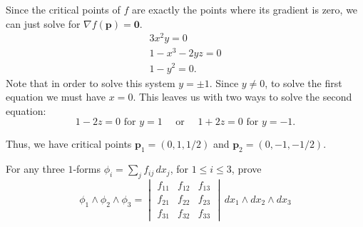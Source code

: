 \documentclass[12 pt, letterpaper]{hmcpset}
\begin{document}
\begin{solution}
\begin{enumerate}
			Since the critical points of $f$ are exactly the points where its gradient is zero, we can just solve for $\nabla f(\mathbf p) = \mathbf 0$.
			\[
				\begin{gathered}
					3 x^2 y = 0 \\
					1 - x^3 - 2y z = 0 \\
					1 - y^2 = 0.
				\end{gathered}
			\]
			Note that in order to solve this system $y = \pm 1$. Since $y \neq 0$, to solve the first equation we must have $x = 0$. This leaves us with two ways to solve the second equation:
			\[
				1 - 2z = 0 \text{ for } y = 1 \quad \text{ or } \quad 1 + 2z = 0 \text{ for } y = - 1.
			\] 

			Thus, we have critical points $\mathbf p_1 = (0, 1, 1/2)$ and $\mathbf p_2 = (0, -1, -1/2)$.
	\end{enumerate}
\end{solution}

\pagebreak

\begin{problem}[Problem 4]
	For any three $1$-forms $\phi_i = \sum_j f_{ij} \, dx_j$, for $1 \le i \le 3$, prove
	\[
		\phi_1 \wedge \phi_2 \wedge \phi_3 = \begin{vmatrix}
			f_{11} & f_{12} & f_{13} \\
			f_{21} & f_{22} & f_{23} \\
			f_{31} & f_{32} & f_{33}
		\end{vmatrix} \, dx_1 \wedge dx_2 \wedge dx_3
	\]
\end{problem}
\end{document}
